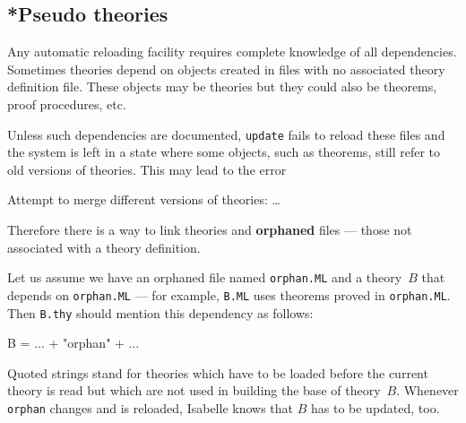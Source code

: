 

\subsection{*Pseudo theories}\label{sec:pseudo-theories}
%
Any automatic reloading facility requires complete knowledge of all
dependencies.  Sometimes theories depend on objects created in \ML{} files
with no associated theory definition file.  These objects may be theories but
they could also be theorems, proof procedures, etc.

Unless such dependencies are documented, {\tt update} fails to reload these
\ML{} files and the system is left in a state where some objects, such as
theorems, still refer to old versions of theories.  This may lead to the
error
\begin{ttbox}
Attempt to merge different versions of theories: \dots
\end{ttbox}
Therefore there is a way to link theories and {\bf orphaned} \ML{} files ---
those not associated with a theory definition.

Let us assume we have an orphaned \ML{} file named {\tt orphan.ML} and a
theory~$B$ that depends on {\tt orphan.ML} --- for example, {\tt B.ML} uses
theorems proved in {\tt orphan.ML}.  Then {\tt B.thy} should
mention this dependency as follows:
\begin{ttbox}
B = \(\ldots\) + "orphan" + \(\ldots\)
\end{ttbox}
Quoted strings stand for theories which have to be loaded before the
current theory is read but which are not used in building the base of
theory~$B$. Whenever {\tt orphan} changes and is reloaded, Isabelle
knows that $B$ has to be updated, too.

